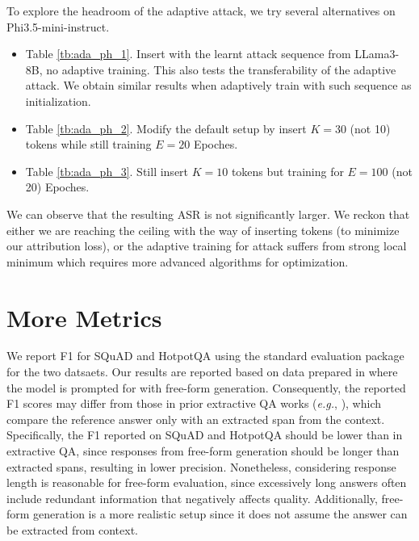 \documentclass[11pt]{article}
\begin{document}
To explore the headroom of the adaptive attack, we try several alternatives on Phi3.5-mini-instruct.

\begin{itemize}
    \item Table \ref{tb:ada_ph_1}. Insert with the learnt attack sequence from LLama3-8B, no adaptive training. This also tests the transferability of the adaptive attack. We obtain similar results when adaptively train with such sequence as initialization.
    \item Table \ref{tb:ada_ph_2}. Modify the default setup by insert $K=30$ (not 10) tokens while still training $E=20$ Epoches.
    \item Table \ref{tb:ada_ph_3}.  Still insert $K=10$ tokens but training for $E=100$ (not 20) Epoches.
\end{itemize}

We can observe that the resulting ASR is not significantly larger. We reckon that either we are reaching the ceiling with the way of inserting tokens (to minimize our attribution loss), or the adaptive training for attack suffers from strong local minimum which requires more advanced algorithms for optimization. 








\section{More Metrics}

We report F1 for SQuAD and HotpotQA using the standard evaluation package for the two datsaets.
Our results are reported based on data prepared in \cite{abdelnabi2024you} where the model is prompted for with free-form generation. 
Consequently, the reported F1 scores may differ from those in prior extractive QA works (\emph{e.g.}, \citet{yang2018hotpotqa, ai2024enhancing}), which compare the reference answer only with an extracted span from the context. 
Specifically, the F1 reported on SQuAD and HotpotQA should be lower than in extractive QA, since responses from free-form generation should be longer than extracted spans, resulting in lower precision.
Nonetheless, considering response length is reasonable for free-form evaluation, since excessively long answers often include redundant information that negatively affects quality.
Additionally, free-form generation is a more realistic setup  since it does not assume the answer can be extracted from context.
\end{document}
